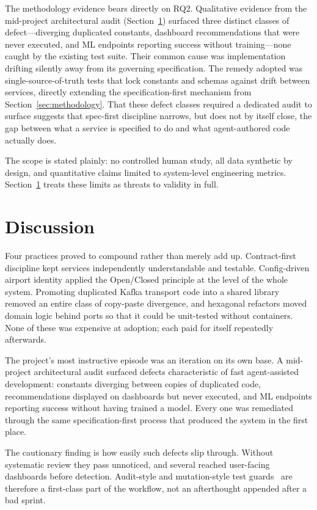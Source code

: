 \documentclass[runningheads]{llncs}
\begin{document}
The methodology evidence bears directly on RQ2. Qualitative evidence from the mid-project architectural audit (Section~\ref{sec:discussion}) surfaced three distinct classes of defect---diverging duplicated constants, dashboard recommendations that were never executed, and ML endpoints reporting success without training---none caught by the existing test suite. Their common cause was implementation drifting silently away from its governing specification. The remedy adopted was single-source-of-truth tests that lock constants and schemas against drift between services, directly extending the specification-first mechanism from Section~\ref{sec:methodology}. That these defect classes required a dedicated audit to surface suggests that spec-first discipline narrows, but does not by itself close, the gap between what a service is specified to do and what agent-authored code actually does.

The scope is stated plainly: no controlled human study, all data synthetic by design, and quantitative claims limited to system-level engineering metrics. Section~\ref{sec:discussion} treats these limits as threats to validity in full.

\section{Discussion}\label{sec:discussion}

Four practices proved to compound rather than merely add up. Contract-first discipline kept services independently understandable and testable. Config-driven airport identity applied the Open/Closed principle at the level of the whole system. Promoting duplicated Kafka transport code into a shared library removed an entire class of copy-paste divergence, and hexagonal refactors moved domain logic behind ports so that it could be unit-tested without containers. None of these was expensive at adoption; each paid for itself repeatedly afterwards.

The project's most instructive episode was an iteration on its own base. A mid-project architectural audit surfaced defects characteristic of fast agent-assisted development: constants diverging between copies of duplicated code, recommendations displayed on dashboards but never executed, and ML endpoints reporting success without having trained a model. Every one was remediated through the same specification-first process that produced the system in the first place.

The cautionary finding is how easily such defects slip through. Without systematic review they pass unnoticed, and several reached user-facing dashboards before detection. Audit-style and mutation-style test guards~\cite{demillo1978} are therefore a first-class part of the workflow, not an afterthought appended after a bad sprint.
\end{document}
